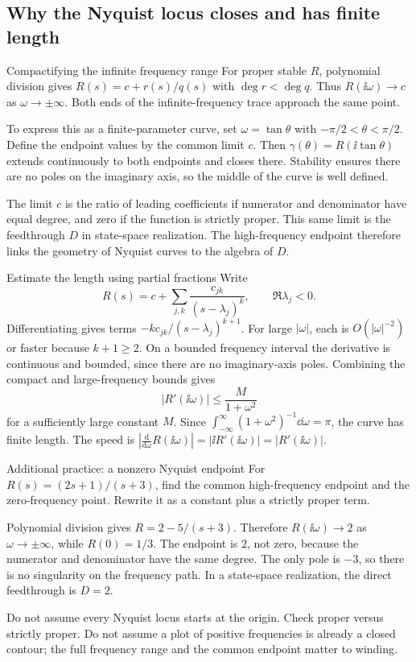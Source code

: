\subsection{Why the Nyquist locus closes and has finite length}
\begin{concept}{Compactifying the infinite frequency range}
For proper stable $R$, polynomial division gives $R(s)=c+r(s)/q(s)$ with $\deg r<\deg q$. Thus $R(\ii\omega)\to c$ as $\omega\to\pm\infty$. Both ends of the infinite-frequency trace approach the same point.

To express this as a finite-parameter curve, set $\omega=\tan\theta$ with $-\pi/2<\theta<\pi/2$. Define the endpoint values by the common limit $c$. Then $\gamma(\theta)=R(\ii\tan\theta)$ extends continuously to both endpoints and closes there. Stability ensures there are no poles on the imaginary axis, so the middle of the curve is well defined.

The limit $c$ is the ratio of leading coefficients if numerator and denominator have equal degree, and zero if the function is strictly proper. This same limit is the feedthrough $D$ in state-space realization. The high-frequency endpoint therefore links the geometry of Nyquist curves to the algebra of $D$.
\end{concept}
\begin{method}{Estimate the length using partial fractions}
Write
\[R(s)=c+\sum_{j,k}\frac{c_{jk}}{(s-\lambda_j)^k},\qquad\Re\lambda_j<0.\]
Differentiating gives terms $-kc_{jk}/(s-\lambda_j)^{k+1}$. For large $|\omega|$, each is $O(|\omega|^{-2})$ or faster because $k+1\geq2$. On a bounded frequency interval the derivative is continuous and bounded, since there are no imaginary-axis poles. Combining the compact and large-frequency bounds gives
\[|R'(\ii\omega)|\leq\frac M{1+\omega^2}\]
for a sufficiently large constant $M$. Since $\int_{-\infty}^{\infty}(1+\omega^2)^{-1}\dd\omega=\pi$, the curve has finite length. The speed is $|\frac{\mathrm d}{\mathrm d\omega}R(\ii\omega)|=|\ii R'(\ii\omega)|=|R'(\ii\omega)|$.
\end{method}
\begin{question}{Additional practice: a nonzero Nyquist endpoint}
For $R(s)=(2s+1)/(s+3)$, find the common high-frequency endpoint and the zero-frequency point. Rewrite it as a constant plus a strictly proper term.
\end{question}
\begin{answer}
Polynomial division gives $R=2-5/(s+3)$. Therefore $R(\ii\omega)\to2$ as $\omega\to\pm\infty$, while $R(0)=1/3$. The endpoint is $2$, not zero, because the numerator and denominator have the same degree. The only pole is $-3$, so there is no singularity on the frequency path. In a state-space realization, the direct feedthrough is $D=2$.
\end{answer}
\begin{tip}
Do not assume every Nyquist locus starts at the origin. Check proper versus strictly proper. Do not assume a plot of positive frequencies is already a closed contour; the full frequency range and the common endpoint matter to winding.
\end{tip}

